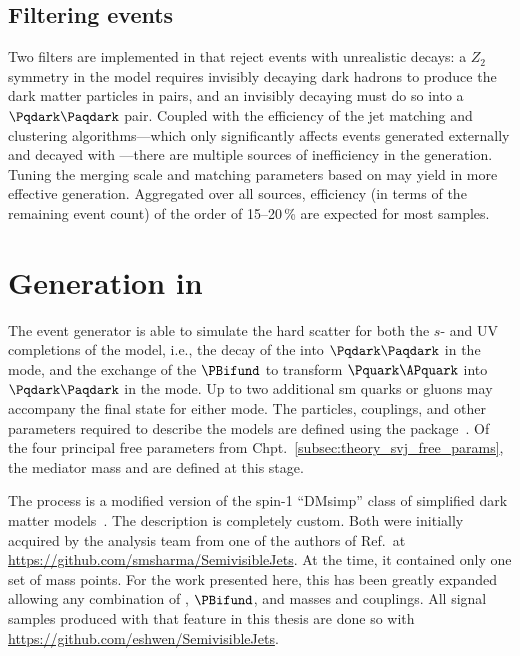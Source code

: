 



\subsection{Filtering events}
\label{subsec:svj_pythia_filters}

Two filters are implemented in \PYTHIA that reject events with unrealistic decays: a $Z_2$ symmetry in the model requires invisibly decaying dark hadrons to produce the dark matter particles in pairs, and an invisibly decaying \PZprime must do so into a $\Pqdark\Paqdark$ pair. Coupled with the efficiency of the \gls{jet} matching and clustering algorithms---which only significantly affects events generated externally and decayed with \PYTHIA---there are multiple sources of inefficiency in the generation. Tuning the merging scale and matching parameters based on \rinv may yield in more effective generation. Aggregated over all sources, efficiency (in terms of the remaining event count) of the order of 15--20\,\% are expected for most \MADGRAPH samples.




\section{Generation in \texorpdfstring{\MADGRAPH}{MadGraph}}
\label{sec:svj_signal_madgraph}

The \MADGRAPHFULL event generator is able to simulate the hard scatter for both the $s$- and \tchannel UV completions of the model, i.e., the decay of the \PZprime into $\Pqdark\Paqdark$ in the \schannel mode, and the exchange of the $\PBifund$ to transform $\Pquark\APquark$ into $\Pqdark\Paqdark$ in the \tchannel mode. Up to two additional \acrlong{sm} quarks or gluons may accompany the final state for either mode. The particles, couplings, and other parameters required to describe the models are defined using the \FEYNRULES package~\cite{Alloul:2013bka}. Of the four principal free parameters from Chpt.~\ref{subsec:theory_svj_free_params}, the mediator mass and \mqdark are defined at this stage.

The \schannel process is a modified version of the spin-1 ``DMsimp'' class of simplified dark matter models~\cite{Backovic:2015soa}. The \tchannel description is completely custom. Both were initially acquired by the analysis team from one of the authors of Ref.~at \url{https://github.com/smsharma/SemivisibleJets}. At the time, it contained only one set of mass points. For the work presented here, this has been greatly expanded allowing any combination of \PZprime, $\PBifund$, and \Pqdark masses and couplings. All signal samples produced with \MADGRAPH that feature in this thesis are done so with \url{https://github.com/eshwen/SemivisibleJets}. %

